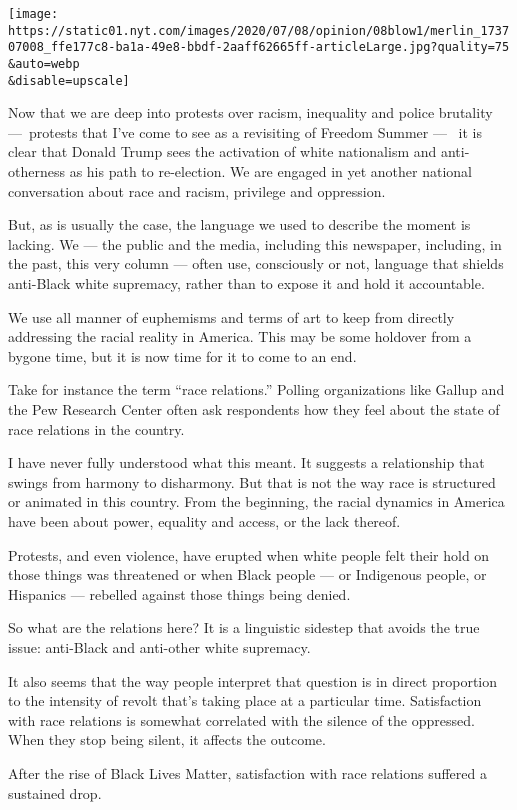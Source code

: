 \texttt{[image: https://static01.nyt.com/images/2020/07/08/opinion/08blow1/merlin\_173707008\_ffe177c8-ba1a-49e8-bbdf-2aaff62665ff-articleLarge.jpg?quality=75\\\&auto=webp\\\&disable=upscale]}

Now that we are deep into protests over racism, inequality and police
brutality ---~protests that I've come to see as a revisiting of Freedom
Summer ---~ it is clear that Donald Trump sees the activation of white
nationalism and anti-otherness as his path to re-election. We are
engaged in yet another national conversation about race and racism,
privilege and oppression.

But, as is usually the case, the language we used to describe the moment
is lacking. We --- the public and the media, including this newspaper,
including, in the past, this very column --- often use, consciously or
not, language that shields anti-Black white supremacy, rather than to
expose it and hold it accountable.

We use all manner of euphemisms and terms of art to keep from directly
addressing the racial reality in America. This may be some holdover from
a bygone time, but it is now time for it to come to an end.

Take for instance the term ``race relations.'' Polling organizations
like Gallup and the Pew Research Center often ask respondents how they
feel about the state of race relations in the country.

I have never fully understood what this meant. It suggests a
relationship that swings from harmony to disharmony. But that is not the
way race is structured or animated in this country. From the beginning,
the racial dynamics in America have been about power, equality and
access, or the lack thereof.

Protests, and even violence, have erupted when white people felt their
hold on those things was threatened or when Black people --- or
Indigenous people, or Hispanics --- rebelled against those things being
denied.

So what are the relations here? It is a linguistic sidestep that avoids
the true issue: anti-Black and anti-other white supremacy.

It also seems that the way people interpret that question is in direct
proportion to the intensity of revolt that's taking place at a
particular time. Satisfaction with race relations is somewhat correlated
with the silence of the oppressed. When they stop being silent, it
affects the outcome.

After the rise of Black Lives Matter, satisfaction with race relations
suffered a sustained drop.

